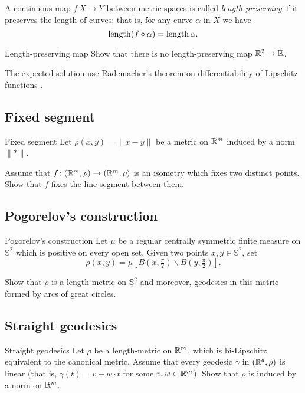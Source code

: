 A continuous map $f\:X\to Y$ between metric spaces is called \emph{length-preserving} if it preserves the length of curves; 
that is, for any curve $\alpha$ in $X$ we have
\[\operatorname{\rm length}(f\circ\alpha)=\operatorname{\rm length}\alpha.\]

\begin{pr}{\thm}{Length-preserving map}\label{two2one} 
Show that there is no length-preserving map $\mathbb{R}^2\to \mathbb{R}$.
\end{pr}

The expected solution use Rademacher's theorem on differentiability of Lipschitz functions \cite[see][]{rademacher}. 



\subsection*{Fixed segment}

\begin{pr}{}{Fixed segment}\label{Fixed segment}
Let $\rho(x,y)=\|x-y\|$ be a metric on $\mathbb{R}^m$ induced by a norm $\|{*}\|$.

Assume that $f\colon(\mathbb{R}^m,\rho)\to(\mathbb{R}^m,\rho)$ is an isometry which fixes two distinct points.
Show that $f$ fixes the line segment between them.
\end{pr}

\subsection*{Pogorelov's construction\easy}

\begin{pr}{}{Pogorelov's construction}\label{Pogorelov's construction}
Let $\mu$ be a regular centrally symmetric finite measure on $\mathbb{S}^2$ which is positive on every open set.
Given two points $x,y\in \mathbb{S}^2$,
set 
\[\rho(x,y)=\mu[B(x,\tfrac \pi2)\backslash B(y,\tfrac\pi2)].\]

Show that $\rho$ is a length-metric on $\mathbb{S}^2$
and moreover, geodesics in this metric formed by arcs of great circles.
\end{pr}

\subsection*{Straight geodesics}

\begin{pr}{}{Straight geodesics}\label{Straight geodesics}
Let $\rho$ be a length-metric on $\mathbb{R}^m$, 
which is bi-Lipschitz equivalent to the canonical metric.
Assume that every geodesic $\gamma$ in $(\mathbb{R}^d,\rho)$ is linear 
(that is, $\gamma(t)=v+w\cdot t$ for some $v,w\in\mathbb{R}^m$).
Show that $\rho$ is induced by a norm on $\mathbb{R}^m$.
\end{pr}

